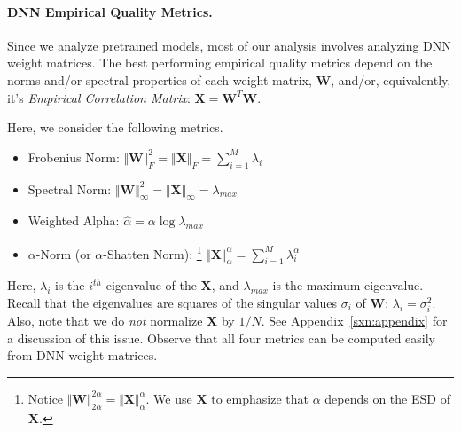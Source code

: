 \paragraph{DNN Empirical Quality Metrics.}

Since we analyze pretrained models, most of our analysis involves analyzing DNN weight matrices.
The best performing empirical quality metrics depend on the norms and/or spectral properties of each weight matrix,
$\mathbf{W}$, and/or, equivalently, it's \emph{Empirical Correlation Matrix}: $\mathbf{X}=\mathbf{W}^{T}\mathbf{W}$.%

Here, we consider the following metrics.

\begin{itemize}
\item 
Frobenius Norm: $\Vert\mathbf{W}\Vert^{2}_{F}=\Vert\mathbf{X}\Vert_{F}=\sum_{i=1}^{M} \lambda_{i}$
\item 
Spectral Norm: $\Vert\mathbf{W}\Vert_{\infty}^{2}=\Vert\mathbf{X}\Vert_{\infty}=\lambda_{max}$
\item 
Weighted Alpha: $\hat{\alpha}=\alpha\log\lambda_{max}$
\item 
$\alpha$-Norm (or $\alpha$-Shatten Norm):%
\footnote{Notice $\Vert\mathbf{W}\Vert^{2\alpha}_{2\alpha}=\Vert\mathbf{X}\Vert^{\alpha}_{\alpha}$. We use $\mathbf{X}$ to emphasize that $\alpha$ depends on the ESD of $\mathbf{X}$.}
 $\Vert\mathbf{X}\Vert^{\alpha}_{\alpha}=\sum_{i=1}^{M}\lambda_{i}^{\alpha}$
\end{itemize}
Here, $\lambda_{i}$ is the $i^{th}$ eigenvalue of the $\mathbf{X}$, and $\lambda_{max}$ is the maximum eigenvalue.
Recall that the eigenvalues are squares of the singular values $\sigma_{i}$ of $\mathbf{W}$: $\lambda_{i}=\sigma^{2}_{i}$.
Also, note that we do \emph{not} normalize $\mathbf{X}$ by $1/N$.
See Appendix~\ref{sxn:appendix} for a discussion of this issue.
Observe that all four metrics can be computed easily from DNN weight matrices.


